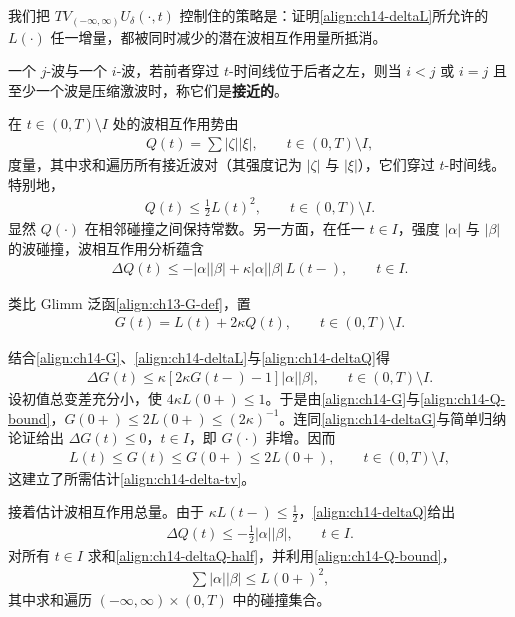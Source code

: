 \documentclass[../../main.tex]{subfiles}
\begin{document}
我们把 $TV_{(-\infty,\infty)}U_\delta(\cdot,t)$ 控制住的策略是：证明\eqref{align:ch14-deltaL}所允许的 $L(\cdot)$ 任一增量，都被同时减少的潜在波相互作用量所抵消。

一个 $j$-波与一个 $i$-波，若前者穿过 $t$-时间线位于后者之左，则当 $i<j$ 或 $i=j$ 且至少一个波是压缩激波时，称它们是\textbf{接近的}。

在 $t\in(0,T)\setminus I$ 处的波相互作用势由
\begin{align}
Q(t)=\sum|\zeta||\xi|,\qquad t\in(0,T)\setminus I,
\label{align:ch14-Q}
\end{align}
度量，其中求和遍历所有接近波对（其强度记为 $|\zeta|$ 与 $|\xi|$），它们穿过 $t$-时间线。特别地，
\begin{align}
Q(t)\leqslant\tfrac12 L(t)^2,\qquad t\in(0,T)\setminus I.
\label{align:ch14-Q-bound}
\end{align}
显然 $Q(\cdot)$ 在相邻碰撞之间保持常数。另一方面，在任一 $t\in I$，强度 $|\alpha|$ 与 $|\beta|$ 的波碰撞，波相互作用分析蕴含
\begin{align}
\Delta Q(t)\leqslant-|\alpha||\beta|+\kappa|\alpha||\beta|\,L(t-),\qquad t\in I.
\label{align:ch14-deltaQ}
\end{align}

类比 Glimm 泛函\eqref{align:ch13-G-def}，置
\begin{align}
G(t)=L(t)+2\kappa Q(t),\qquad t\in(0,T)\setminus I.
\label{align:ch14-G}
\end{align}

结合\eqref{align:ch14-G}、\eqref{align:ch14-deltaL}与\eqref{align:ch14-deltaQ}得
\begin{align}
\Delta G(t)\leqslant\kappa[2\kappa G(t-)-1]|\alpha||\beta|,\qquad t\in(0,T)\setminus I.
\label{align:ch14-deltaG}
\end{align}
设初值总变差充分小，使 $4\kappa L(0+)\leqslant1$。于是由\eqref{align:ch14-G}与\eqref{align:ch14-Q-bound}，$G(0+)\leqslant2L(0+)\leqslant(2\kappa)^{-1}$。连同\eqref{align:ch14-deltaG}与简单归纳论证给出 $\Delta G(t)\leqslant0$，$t\in I$，即 $G(\cdot)$ 非增。因而
\begin{align}
L(t)\leqslant G(t)\leqslant G(0+)\leqslant2L(0+),\qquad t\in(0,T)\setminus I,
\label{align:ch14-L-bound}
\end{align}
这建立了所需估计\eqref{align:ch14-delta-tv}。

接着估计波相互作用总量。由于 $\kappa L(t-)\leqslant\frac12$，\eqref{align:ch14-deltaQ}给出
\begin{align}
\Delta Q(t)\leqslant-\tfrac12|\alpha||\beta|,\qquad t\in I.
\label{align:ch14-deltaQ-half}
\end{align}
对所有 $t\in I$ 求和\eqref{align:ch14-deltaQ-half}，并利用\eqref{align:ch14-Q-bound}，
\begin{align}
\sum|\alpha||\beta|\leqslant L(0+)^2,
\label{align:ch14-interaction-total}
\end{align}
其中求和遍历 $(-\infty,\infty)\times(0,T)$ 中的碰撞集合。
\end{document}
